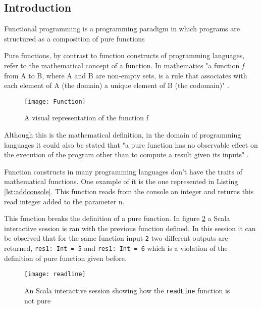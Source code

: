\documentclass[../main.tex]{subfiles}
\begin{document}
\subsection{Introduction} Functional programming is a programming paradigm in
which programs are structured as a composition of pure functions
\autocite{Hughes1989WhyMatters}

Pure functions, by contrast to function constructs of programming languages,
refer to the mathematical concept of a function. In mathematics "a function \textit{f}
from A to B, where A and B are non-empty sets, is a rule that associates with
each element of A (the domain) a unique element of B (the codomain)"
\autocite{NicholsonTheMathematics}.

\begin{figure}[ht]
  \centering \texttt{[image: Function]}
  \caption{\label{fig:label} A visual representation of the function f}
\end{figure}


Although this is the mathematical definition, in the domain of programming
languages it could also be stated that "a pure function has no observable effect
on the execution of the program other than to compute a result given its inputs"
\autocite{Chiusano2013FunctionalScala}.

Function constructs in many programming languages don't have the
traits of mathematical functions. One example of it is the one represented in
Listing \ref{lst:addconsole}. This function reads from the console an integer
and returns this read integer added to the parameter n.



This function breaks the definition of a pure function. In figure
\ref{fig:readLineN} a Scala interactive session is ran with the previous
function defined. In this session it can be observed that for the same function input
\texttt{2} two different outputs are returned, \texttt{res1: Int = 5} and \texttt{res1:
  Int = 6} which is a violation of the definition of pure function given before.

\begin{figure}[ht]
  \centering \texttt{[image: readline]}
  \caption{\label{fig:readLineN} An Scala interactive session showing how the
    \texttt{readLine} function is not pure}
\end{figure}
\end{document}
